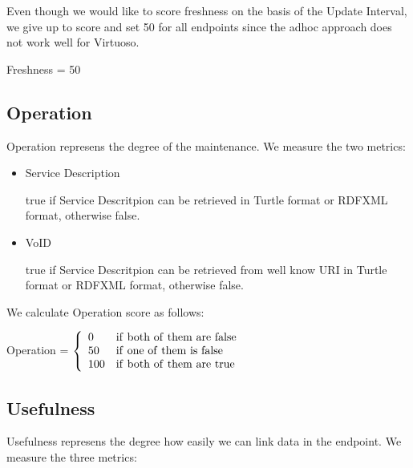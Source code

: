 \documentclass[11pt,a4paper]{article}
\begin{document}
Even though we would like to score freshness on the basis of the Update Interval,
we give up to score and set 50 for all endpoints since the adhoc approach does not work well for Virtuoso.

\begin{mdframed}
  \center
Freshness = 50
\end{mdframed}

\subsection{Operation}

Operation represens the degree of the maintenance.
We measure the two metrics:

\begin{itemize}

  \item Service Description

  true if Service Descritpion can be retrieved in Turtle format or RDFXML format, otherwise false.

  \item VoID

  true if Service Descritpion can be retrieved from well know URI\cite{Alexandar:11:VoID} in Turtle format or RDFXML format, otherwise false.

\end{itemize}

We calculate Operation score as follows:

\begin{mdframed}
\center
Operation = $\left\{
    \begin{array}{ll}
      0   & {\rm if~both~of~them~are~false } \\
      50  & {\rm if~one~of~them~is~false } \\
      100 & {\rm if~both~of~them~are~true }
  \end{array}
  \right.$
\end{mdframed}

\subsection{Usefulness}

Usefulness represens the degree how easily we can link data in the endpoint.
We measure the three metrics:
\end{document}
